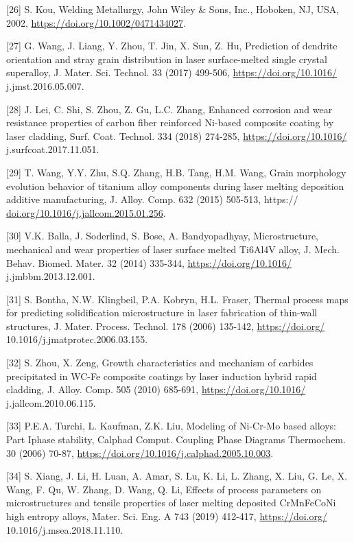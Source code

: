 \documentclass[10pt]{article}
\begin{document}
[26] S. Kou, Welding Metallurgy, John Wiley \& Sons, Inc., Hoboken, NJ, USA, 2002, \href{https://doi.org/10.1002/0471434027}{https://doi.org/10.1002/0471434027}.

[27] G. Wang, J. Liang, Y. Zhou, T. Jin, X. Sun, Z. Hu, Prediction of dendrite orientation and stray grain distribution in laser surface-melted single crystal superalloy, J. Mater. Sci. Technol. 33 (2017) 499-506, \href{https://doi.org/10.1016/}{https://doi.org/10.1016/} j.jmst.2016.05.007.

[28] J. Lei, C. Shi, S. Zhou, Z. Gu, L.C. Zhang, Enhanced corrosion and wear resistance properties of carbon fiber reinforced Ni-based composite coating by laser cladding, Surf. Coat. Technol. 334 (2018) 274-285, \href{https://doi.org/10.1016/}{https://doi.org/10.1016/} j.surfcoat.2017.11.051.

[29] T. Wang, Y.Y. Zhu, S.Q. Zhang, H.B. Tang, H.M. Wang, Grain morphology evolution behavior of titanium alloy components during laser melting deposition additive manufacturing, J. Alloy. Comp. 632 (2015) 505-513, https:// \href{http://doi.org/10.1016/j.jallcom.2015.01.256}{doi.org/10.1016/j.jallcom.2015.01.256}.

[30] V.K. Balla, J. Soderlind, S. Bose, A. Bandyopadhyay, Microstructure, mechanical and wear properties of laser surface melted Ti6Al4V alloy, J. Mech. Behav. Biomed. Mater. 32 (2014) 335-344, \href{https://doi.org/10.1016/}{https://doi.org/10.1016/} j.jmbbm.2013.12.001.

[31] S. Bontha, N.W. Klingbeil, P.A. Kobryn, H.L. Fraser, Thermal process maps for predicting solidification microstructure in laser fabrication of thin-wall structures, J. Mater. Process. Technol. 178 (2006) 135-142, \href{https://doi.org/}{https://doi.org/} 10.1016/j.jmatprotec.2006.03.155.

[32] S. Zhou, X. Zeng, Growth characteristics and mechanism of carbides precipitated in WC-Fe composite coatings by laser induction hybrid rapid cladding, J. Alloy. Comp. 505 (2010) 685-691, \href{https://doi.org/10.1016/}{https://doi.org/10.1016/} j.jallcom.2010.06.115.

[33] P.E.A. Turchi, L. Kaufman, Z.K. Liu, Modeling of Ni-Cr-Mo based alloys: Part Iphase stability, Calphad Comput. Coupling Phase Diagrams Thermochem. 30 (2006) 70-87, \href{https://doi.org/10.1016/j.calphad.2005.10.003}{https://doi.org/10.1016/j.calphad.2005.10.003}.

[34] S. Xiang, J. Li, H. Luan, A. Amar, S. Lu, K. Li, L. Zhang, X. Liu, G. Le, X. Wang, F. Qu, W. Zhang, D. Wang, Q. Li, Effects of process parameters on microstructures and tensile properties of laser melting deposited CrMnFeCoNi high entropy alloys, Mater. Sci. Eng. A 743 (2019) 412-417, \href{https://doi.org/}{https://doi.org/} 10.1016/j.msea.2018.11.110.
\end{document}
